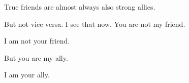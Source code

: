 \begin{paracol}{2}
\begin{leftcolumn}
\begin{ally}
True friends are almost always also strong allies.
\end{ally}
But not vice versa. I see that now. You are not my friend.

\begin{ally}
I am not your friend.
\end{ally}
But you are my ally.

\begin{ally}
I am your ally.
\end{ally}
\newpage

\end{leftcolumn}
\end{paracol}

